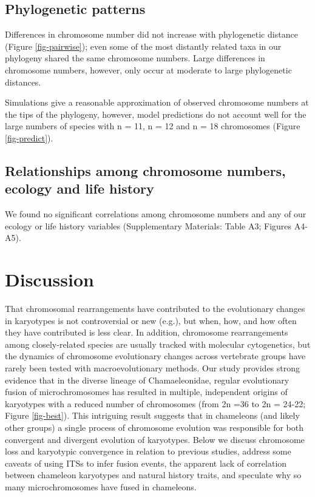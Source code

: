 \documentclass[a4paper, 12pt]{article}
\begin{document}
\subsection{Phylogenetic patterns}
Differences in chromosome number did not increase with phylogenetic distance (Figure \ref{fig-pairwise}); even some of the most distantly related taxa in our phylogeny shared the same chromosome numbers. 
Large differences in chromosome numbers, however, only occur at moderate to large phylogenetic distances. 

Simulations give a reasonable approximation of observed chromosome numbers at the tips of the phylogeny, however, model predictions do not account well for the large numbers of species with n = 11, n = 12 and n = 18 chromosomes (Figure \ref{fig-predict}).

\subsection{Relationships among chromosome numbers, ecology and life history}
We found no significant correlations among chromosome numbers and any of our ecology or life history variables (Supplementary Materials: Table A3; Figures A4-A5). 

\section{Discussion}

That chromosomal rearrangements have contributed to the evolutionary changes in karyotypes is not controversial or new (e.g.\cite{deakin2016anchoring}), but when, how, and how often they have contributed is less clear. 
In addition, chromosome rearrangements among closely-related species are usually tracked with molecular cytogenetics\cite{lisachov2021whole}, but the dynamics of chromosome evolutionary changes across vertebrate groups have rarely been tested with macroevolutionary methods. 
Our study provides strong evidence that in the diverse lineage of Chamaeleonidae, regular evolutionary fusion of microchromosomes has resulted in multiple, independent origins of karyotypes with a reduced number of chromosomes (from 2n =36 to 2n = 24-22; Figure \ref{fig-best}). 
This intriguing result suggests that in chameleons (and likely other groups) a single process of chromosome evolution was responsible for both convergent and divergent evolution of karyotypes. 
Below we discuss chromosome loss and karyotypic convergence in relation to previous studies, address some caveats of using ITSs to infer fusion events, the apparent lack of correlation between chameleon karyotypes and natural history traits, and speculate why so many microchromosomes have fused in chameleons.    
\end{document}
